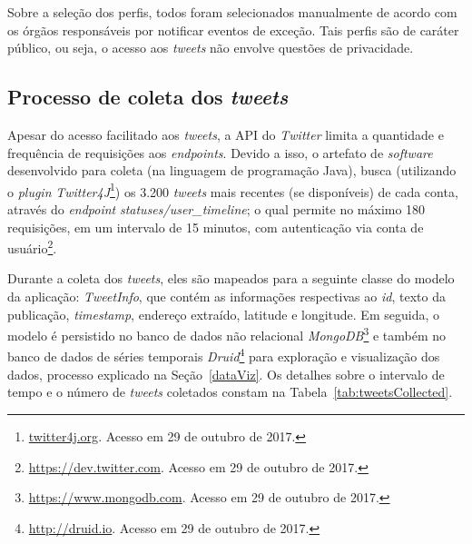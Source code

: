 \documentclass[
	12pt,				%
	oneside,			%
	a4paper,			%
	english,			%
	brazil				%
	]{abntex2ppgsi}
\begin{document}
{{{Sobre a seleção dos perfis, todos foram selecionados manualmente de acordo com os órgãos responsáveis por notificar eventos de exceção. Tais perfis são de caráter público, ou seja, o acesso aos \textit{tweets} não envolve questões de privacidade.

\subsection{Processo de coleta dos \textit{tweets}}

Apesar do acesso facilitado aos \textit{tweets}, a API do \textit{Twitter} limita a quantidade e frequência de requisições aos \textit{endpoints}. Devido a isso, o artefato de \textit{software} desenvolvido para coleta (na linguagem de programação Java), busca (utilizando o \textit{plugin} \textit{Twitter4J}\footnote{\url{twitter4j.org}. Acesso em 29 de outubro de 2017.}) os 3.200 \textit{tweets} mais recentes (se disponíveis) de cada conta, através do \textit{endpoint} \textit{statuses/user\_timeline}; o qual permite no máximo 180 requisições, em um intervalo de 15 minutos, com autenticação via conta de usuário\footnote{\url{https://dev.twitter.com}. Acesso em 29 de outubro de 2017.}.

Durante a coleta dos \textit{tweets}, eles são mapeados para a seguinte classe do modelo da aplicação: \textit{TweetInfo}, que contém as informações respectivas ao \textit{id}, texto da publicação, \textit{timestamp}, endereço extraído, latitude e longitude. Em seguida, o modelo é persistido no banco de dados não relacional \textit{MongoDB}\footnote{\url{https://www.mongodb.com}. Acesso em 29 de outubro de 2017.} e também no banco de dados de séries temporais \textit{Druid}\footnote{\url{http://druid.io}. Acesso em 29 de outubro de 2017.} para exploração e visualização dos dados, processo explicado na Seção~\ref{dataViz}. Os detalhes sobre o intervalo de tempo e o número de \textit{tweets} coletados constam na Tabela~\ref{tab:tweetsCollected}.

}}}
\end{document}

